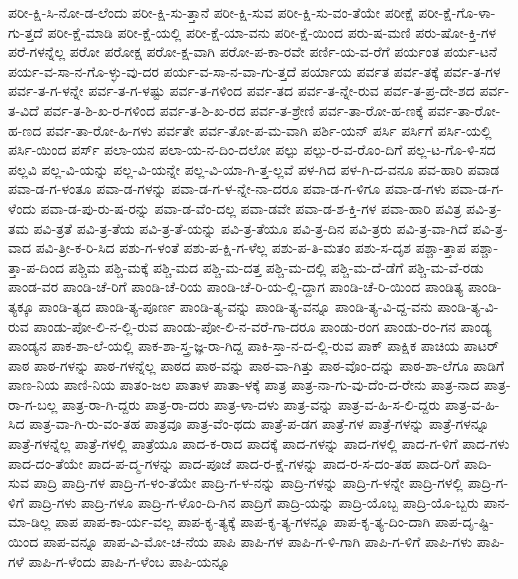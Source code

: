 {ಪರೀ-ಕ್ಷಿ-ಸಿ-ನೋ-ಡ-ಲೆಂದು
ಪರೀ-ಕ್ಷಿ-ಸು-ತ್ತಾನೆ
ಪರೀ-ಕ್ಷಿ-ಸುವ
ಪರೀ-ಕ್ಷಿ-ಸು-ವಂ-ತೆಯೇ
ಪರೀಕ್ಷೆ
ಪರೀ-ಕ್ಷೆ-ಗೊ-ಳಾ-ಗು-ತ್ತದೆ
ಪರೀ-ಕ್ಷೆ-ಮಾಡಿ
ಪರೀ-ಕ್ಷೆ-ಯಲ್ಲಿ
ಪರೀ-ಕ್ಷೆ-ಯಾ-ವನು
ಪರೀ-ಕ್ಷೆ-ಯಿಂದ
ಪರು-ಷ-ಮಣಿ
ಪರು-ಷೋ-ಕ್ತಿ-ಗಳ
ಪರೆ-ಗಳನ್ನೆಲ್ಲ
ಪರೋ
ಪರೋಕ್ಷ
ಪರೋ-ಕ್ಷ-ವಾಗಿ
ಪರೋ-ಪ-ಕಾ-ರವೇ
ಪರ್ಣಿ-ಯ-ವ-ರೆಗೆ
ಪರ್ಯಂತ
ಪರ್ಯ-ಟನೆ
ಪರ್ಯ-ವ-ಸಾ-ನ-ಗೊ-ಳ್ಳು-ವು-ದರ
ಪರ್ಯ-ವ-ಸಾ-ನ-ವಾ-ಗು-ತ್ತದೆ
ಪರ್ಯಾಯ
ಪರ್ವತ
ಪರ್ವ-ತಕ್ಕೆ
ಪರ್ವ-ತ-ಗಳ
ಪರ್ವ-ತ-ಗ-ಳನ್ನೇ
ಪರ್ವ-ತ-ಗ-ಳಷ್ಟು
ಪರ್ವ-ತ-ಗಳಿಂದ
ಪರ್ವ-ತದ
ಪರ್ವ-ತ-ನ್ನೇ-ರುವ
ಪರ್ವ-ತ-ಪ್ರ-ದೇ-ಶದ
ಪರ್ವ-ತ-ವಿದೆ
ಪರ್ವ-ತ-ಶಿ-ಖ-ರ-ಗಳಿಂದ
ಪರ್ವ-ತ-ಶಿ-ಖ-ರದ
ಪರ್ವ-ತ-ಶ್ರೇಣಿ
ಪರ್ವ-ತಾ-ರೋ-ಹ-ಣಕ್ಕೆ
ಪರ್ವ-ತಾ-ರೋ-ಹ-ಣದ
ಪರ್ವ-ತಾ-ರೋ-ಹಿ-ಗಳು
ಪರ್ವತೇ
ಪರ್ವ-ತೋ-ಪ-ಮ-ವಾಗಿ
ಪರ್ಶಿ-ಯನ್
ಪರ್ಸಿ
ಪರ್ಸಿಗೆ
ಪರ್ಸಿ-ಯಲ್ಲಿ
ಪರ್ಸಿ-ಯಿಂದ
ಪರ್ಸ್
ಪಲಾ-ಯನ
ಪಲಾ-ಯ-ನ-ದಿಂ-ದಲೋ
ಪಲ್ಪು
ಪಲ್ಪು-ರ-ವ-ರೊಂ-ದಿಗೆ
ಪಲ್ಲ-ಟ-ಗೊ-ಳಿ-ಸದ
ಪಲ್ಲವಿ
ಪಲ್ಲ-ವಿ-ಯನ್ನು
ಪಲ್ಲ-ವಿ-ಯನ್ನೇ
ಪಲ್ಲ-ವಿ-ಯಾ-ಗಿ-ತ್ತ-ಲ್ಲವೆ
ಪಳ-ಗಿದ
ಪಳ-ಗಿ-ದ-ವನೂ
ಪವ-ಹಾರಿ
ಪವಾಡ
ಪವಾ-ಡ-ಗ-ಳಂತೂ
ಪವಾ-ಡ-ಗಳನ್ನು
ಪವಾ-ಡ-ಗ-ಳ-ನ್ನೇ-ನಾ-ದರೂ
ಪವಾ-ಡ-ಗ-ಳಿಗೂ
ಪವಾ-ಡ-ಗಳು
ಪವಾ-ಡ-ಗ-ಳೆಂದು
ಪವಾ-ಡ-ಪು-ರು-ಷ-ರನ್ನು
ಪವಾ-ಡ-ವೆಂ-ದಲ್ಲ
ಪವಾ-ಡವೇ
ಪವಾ-ಡ-ಶ-ಕ್ತಿ-ಗಳ
ಪವಾ-ಹಾರಿ
ಪವಿತ್ರ
ಪವಿ-ತ್ರ-ತಮ
ಪವಿ-ತ್ರತೆ
ಪವಿ-ತ್ರ-ತೆಯ
ಪವಿ-ತ್ರ-ತೆ-ಯನ್ನು
ಪವಿ-ತ್ರ-ತೆಯೂ
ಪವಿ-ತ್ರ-ದಿನ
ಪವಿ-ತ್ರರು
ಪವಿ-ತ್ರ-ವಾ-ಗಿದೆ
ಪವಿ-ತ್ರ-ವಾದ
ಪವಿ-ತ್ರೀ-ಕ-ರಿ-ಸಿದ
ಪಶು-ಗ-ಳಂತೆ
ಪಶು-ಪ-ಕ್ಷಿ-ಗ-ಳೆಲ್ಲ
ಪಶು-ಪ-ತಿ-ಮತಂ
ಪಶು-ಸ-ದೃಶ
ಪಶ್ಚಾ-ತ್ತಾಪ
ಪಶ್ಚಾ-ತ್ತಾ-ಪ-ದಿಂದ
ಪಶ್ಚಿಮ
ಪಶ್ಚಿ-ಮಕ್ಕೆ
ಪಶ್ಚಿ-ಮದ
ಪಶ್ಚಿ-ಮ-ದತ್ತ
ಪಶ್ಚಿ-ಮ-ದಲ್ಲಿ
ಪಶ್ಚಿ-ಮ-ದೆ-ಡೆಗೆ
ಪಶ್ಚಿ-ಮ-ವೆ-ರಡು
ಪಾಂಡ-ವರ
ಪಾಂಡಿ-ಚೆ-ರಿಗೆ
ಪಾಂಡಿ-ಚೆ-ರಿಯ
ಪಾಂಡಿ-ಚೆ-ರಿ-ಯ-ಲ್ಲಿ-ದ್ದಾಗ
ಪಾಂಡಿ-ಚೆ-ರಿ-ಯಿಂದ
ಪಾಂಡಿತ್ಯ
ಪಾಂಡಿ-ತ್ಯಕ್ಕೂ
ಪಾಂಡಿ-ತ್ಯದ
ಪಾಂಡಿ-ತ್ಯ-ಪೂರ್ಣ
ಪಾಂಡಿ-ತ್ಯ-ವನ್ನು
ಪಾಂಡಿ-ತ್ಯ-ವನ್ನೂ
ಪಾಂಡಿ-ತ್ಯ-ವಿ-ದ್ದ-ವನು
ಪಾಂಡಿ-ತ್ಯ-ವಿ-ರುವ
ಪಾಂಡು-ಪೋ-ಲಿ-ನ-ಲ್ಲಿ-ರುವ
ಪಾಂಡು-ಪೋ-ಲಿ-ನ-ವರೆ-ಗಾ-ದರೂ
ಪಾಂಡು-ರಂಗ
ಪಾಂಡು-ರಂ-ಗನ
ಪಾಂಡ್ಯ
ಪಾಂಡ್ಯನ
ಪಾಕ-ಶಾ-ಲೆ-ಯಲ್ಲಿ
ಪಾಕ-ಶಾ-ಸ್ತ್ರ-ಜ್ಞ-ರಾ-ಗಿದ್ದ
ಪಾಕಿ-ಸ್ತಾ-ನ-ದ-ಲ್ಲಿ-ರುವ
ಪಾಕ್
ಪಾಕ್ಷಿಕ
ಪಾಚಿಯ
ಪಾಟರ್
ಪಾಠ
ಪಾಠ-ಗಳನ್ನು
ಪಾಠ-ಗಳನ್ನೆಲ್ಲ
ಪಾಠದ
ಪಾಠ-ವನ್ನು
ಪಾಠ-ವಾ-ಗಿತ್ತು
ಪಾಠ-ವೊಂ-ದನ್ನು
ಪಾಠ-ಶಾ-ಲೆಗೂ
ಪಾಡಿಗೆ
ಪಾಣ-ನಿಯ
ಪಾಣಿ-ನಿಯ
ಪಾತಂ-ಜಲ
ಪಾತಾಳ
ಪಾತಾ-ಳಕ್ಕೆ
ಪಾತ್ರ
ಪಾತ್ರ-ನಾ-ಗು-ವು-ದೆಂ-ದ-ರೇನು
ಪಾತ್ರ-ನಾದ
ಪಾತ್ರ-ರಾ-ಗ-ಬಲ್ಲ
ಪಾತ್ರ-ರಾ-ಗಿ-ದ್ದರು
ಪಾತ್ರ-ರಾ-ದರು
ಪಾತ್ರ-ಳಾ-ದಳು
ಪಾತ್ರ-ವನ್ನು
ಪಾತ್ರ-ವ-ಹಿ-ಸ-ಲಿ-ದ್ದರು
ಪಾತ್ರ-ವ-ಹಿ-ಸಿದ
ಪಾತ್ರ-ವಾ-ಗಿ-ರು-ವಂ-ತಹ
ಪಾತ್ರವೂ
ಪಾತ್ರ-ವೆಂ-ಥದು
ಪಾತ್ರೆ-ಪ-ಡಗ
ಪಾತ್ರೆ-ಗಳ
ಪಾತ್ರೆ-ಗಳನ್ನು
ಪಾತ್ರೆ-ಗಳನ್ನೂ
ಪಾತ್ರೆ-ಗಳನ್ನೆಲ್ಲ
ಪಾತ್ರೆ-ಗಳಲ್ಲಿ
ಪಾತ್ರೆಯೂ
ಪಾದ-ಕ-ರಾದ
ಪಾದಕ್ಕೆ
ಪಾದ-ಗಳನ್ನು
ಪಾದ-ಗಳಲ್ಲಿ
ಪಾದ-ಗ-ಳಿಗೆ
ಪಾದ-ಗಳು
ಪಾದ-ದಂ-ತೆಯೇ
ಪಾದ-ಪ-ದ್ಮ-ಗಳನ್ನು
ಪಾದ-ಪೂಜೆ
ಪಾದ-ರ-ಕ್ಷೆ-ಗಳನ್ನು
ಪಾದ-ರ-ಸ-ದಂ-ತಹ
ಪಾದ-ರಿಗೆ
ಪಾದಿ-ಸುವ
ಪಾದ್ರಿ
ಪಾದ್ರಿ-ಗಳ
ಪಾದ್ರಿ-ಗ-ಳಂ-ತೆಯೇ
ಪಾದ್ರಿ-ಗ-ಳ-ನನ್ನು
ಪಾದ್ರಿ-ಗಳನ್ನು
ಪಾದ್ರಿ-ಗ-ಳನ್ನೇ
ಪಾದ್ರಿ-ಗಳಲ್ಲಿ
ಪಾದ್ರಿ-ಗ-ಳಿಗೆ
ಪಾದ್ರಿ-ಗಳು
ಪಾದ್ರಿ-ಗಳೂ
ಪಾದ್ರಿ-ಗ-ಳೊಂ-ದಿ-ಗಿನ
ಪಾದ್ರಿಗೆ
ಪಾದ್ರಿ-ಯನ್ನು
ಪಾದ್ರಿ-ಯೊಬ್ಬ
ಪಾದ್ರಿ-ಯೊ-ಬ್ಬರು
ಪಾನ-ಮಾ-ಡಿಲ್ಲ
ಪಾಪ
ಪಾಪ-ಕಾ-ರ್ಯ-ವಲ್ಲ
ಪಾಪ-ಕೃ-ತ್ಯಕ್ಕೆ
ಪಾಪ-ಕೃ-ತ್ಯ-ಗಳನ್ನೂ
ಪಾಪ-ಕೃ-ತ್ಯ-ದಿಂ-ದಾಗಿ
ಪಾಪ-ದೃ-ಷ್ಟಿ-ಯಿಂದ
ಪಾಪ-ವನ್ನೂ
ಪಾಪ-ವಿ-ಮೋ-ಚ-ನೆಯ
ಪಾಪಿ
ಪಾಪಿ-ಗಳ
ಪಾಪಿ-ಗ-ಳಿ-ಗಾಗಿ
ಪಾಪಿ-ಗ-ಳಿಗೆ
ಪಾಪಿ-ಗಳು
ಪಾಪಿ-ಗಳೆ
ಪಾಪಿ-ಗ-ಳೆಂದು
ಪಾಪಿ-ಗ-ಳೆಂಬ
ಪಾಪಿ-ಯನ್ನೂ
}
